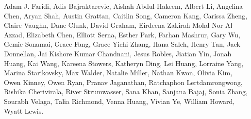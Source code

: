 Adam J. Faridi,
Adis Bajraktarevic,
Aishah Abdul-Hakeem,
Albert Li,
Angelina Chen,
Aryan Shah,
Austin Grattan,
Caitlin Song,
Cameron Kang,
Carissa Zheng,
Claire Vaughn,
Dane Clunk,
David Graham,
Eirdeena Zakirah Mohd Nor Al-Azzad,
Elizabeth Chen,
Elliott Serna,
Esther Park,
Farhan Mashrur,
Gary Wu,
Gemie Sonamai,
Grace Fang,
Grace Yichi Zhang,
Hana Saleh,
Henry Tan,
Jack Donnellan,
Jai Kishore Kumar Chandnani,
Jesus Robles,
Jiatian Yin,
Jonah Huang,
Kai Wang,
Kareena Stowers,
Katheryn Ding,
Lei Huang,
Lorraine Yang,
Marina Starikovsky,
Max Walder,
Natalie Miller,
Nathan Kwon,
Olivia Kim,
Owen Kinney,
Owen Ryan,
Pranav Jaganathan,
Ratchaphon Lertdamrongwong,
Rishika Cherivirala,
River Strumwasser,
Sana Khan,
Sanjana Bajaj,
Sonia Zhang,
Sourabh Velaga,
Talia Richmond,
Venna Huang,
Vivian Ye,
William Howard,
Wyatt Lewis.
